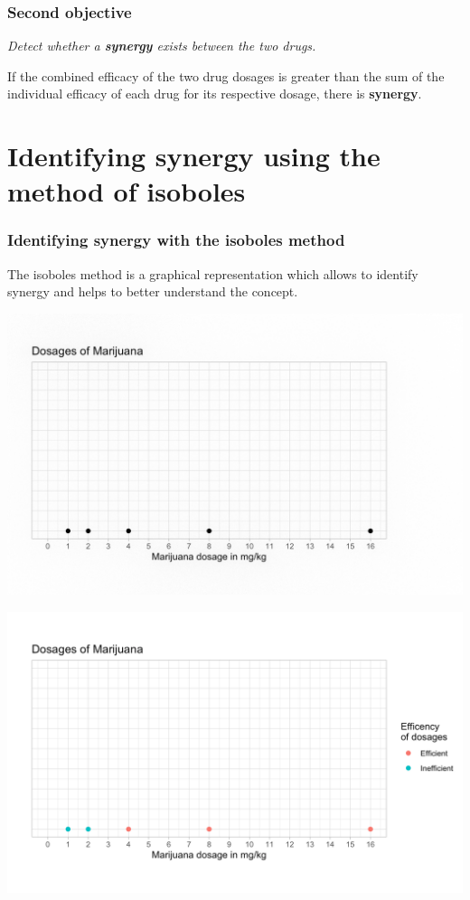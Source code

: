 \documentclass[14pt]{beamer}
\begin{document}
\begin{frame}
\frametitle{Second objective}
\textit{Detect whether a \textbf{synergy} exists between the two drugs.}

\bigskip

If the combined efficacy of the two drug dosages is greater than the sum of the individual efficacy of each drug for its respective dosage, there is \textbf{synergy}.
\end{frame}


\section{Identifying synergy using the method of isoboles}
\begin{frame}
\frametitle{Identifying synergy with the isoboles method}
The isoboles method is a graphical representation which allows to identify synergy and helps to better understand the concept.
\end{frame}

\begin{frame}
\begin{center}
\includegraphics[scale=0.23]{img1.png}
\end{center}
\end{frame}

\begin{frame}
\begin{center}
\includegraphics[scale=0.23]{img2.png}
\end{center}
\end{frame}
\end{document}
